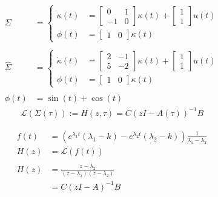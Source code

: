 \documentclass[11 pt]{article}
\newcommand{\1}{\mathbbm{1}}
\begin{document}
       \begin{align*}
         \Sigma &= \left\{ \begin{array}{ll}
           \dot{\kappa}(t) &= \left[ \begin{array}{cc} 0 & 1 \\ -1 & 0 \end{array} \right] \kappa(t) + \left[ \begin{array}{c} 1 \\ 1 \end{array}\right] u(t) \\
             \phi(t) &= \left[ \begin{array}{cc} 1 & 0 \end{array} \right] \kappa(t)
         \end{array} \right. \\ \\
         \widehat{\Sigma} &= \left\{ \begin{array}{ll}
           \dot{\kappa}(t) &= \left[ \begin{array}{cc} 2 & -1 \\ 5 & -2 \end{array} \right] \kappa(t) + \left[ \begin{array}{c} 1 \\ 1 \end{array}\right] u(t) \\
             \phi(t) &= \left[ \begin{array}{cc} 1 & 0 \end{array} \right] \kappa(t)
         \end{array} \right. \\ \\
         \phi(t) &= \sin(t) + \cos(t)
    \end{align*}
    \begin{align*}
      \mathcal{L}(\Sigma(\tau)) := H(z, \tau) = C \left(zI - A(\tau) \right)^{-1} B
    \end{align*}
    
    \begin{align*}
      f(t) &= \left( e^{\lambda_{1} t} \left(\lambda_{1} - k\right) - e^{\lambda_{2}t}\left(\lambda_{2} - k \right) \right) \frac{1}{\lambda_{1}-\lambda_{2}} \\
        H(z) &= \mathcal{L}\left(f(t)\right) \\ \\
        H(z) &= \frac{z - \lambda_{2}}{\left(z -\lambda_{1} \right)\left(z - \lambda_{2} \right)} \\
        &= C( zI - A)^{-1}B
    \end{align*}
\end{document}
